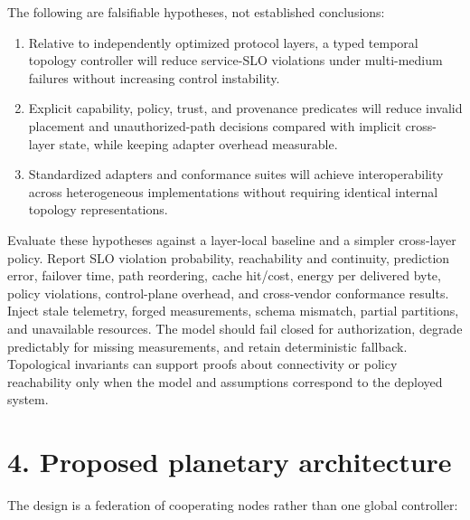 \documentclass[
  american,
  11pt,
]{article}
\providecommand{\tightlist}{%
  \setlength{\itemsep}{0pt}\setlength{\parskip}{0pt}}
\begin{document}
The following are falsifiable hypotheses, not established conclusions:

\begin{enumerate}
\def\labelenumi{\arabic{enumi}.}
\tightlist
\item
  Relative to independently optimized protocol layers, a typed temporal
  topology controller will reduce service-SLO violations under
  multi-medium failures without increasing control instability.
\item
  Explicit capability, policy, trust, and provenance predicates will
  reduce invalid placement and unauthorized-path decisions compared with
  implicit cross-layer state, while keeping adapter overhead measurable.
\item
  Standardized adapters and conformance suites will achieve
  interoperability across heterogeneous implementations without
  requiring identical internal topology representations.
\end{enumerate}

Evaluate these hypotheses against a layer-local baseline and a simpler
cross-layer policy. Report SLO violation probability, reachability and
continuity, prediction error, failover time, path reordering, cache
hit/cost, energy per delivered byte, policy violations, control-plane
overhead, and cross-vendor conformance results. Inject stale telemetry,
forged measurements, schema mismatch, partial partitions, and
unavailable resources. The model should fail closed for authorization,
degrade predictably for missing measurements, and retain deterministic
fallback. Topological invariants can support proofs about connectivity
or policy reachability only when the model and assumptions correspond to
the deployed system.

\section{4. Proposed planetary
architecture}\label{proposed-planetary-architecture}

The design is a federation of cooperating nodes rather than one global
controller:
\end{document}
